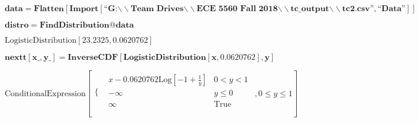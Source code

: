 
\usepackage{amsmath, amssymb, graphics, setspace}

\begin{doublespace}
\noindent\(\pmb{\text{data} = \text{Flatten}[\text{Import}[\text{{``}G:$\backslash \backslash $Team Drives$\backslash \backslash $ECE 5560 Fall 2018$\backslash
\backslash $tc$\_$output$\backslash \backslash $tc2.csv{''}},\text{{``}Data{''}}]]}\)
\end{doublespace}

\begin{doublespace}
\noindent\(\pmb{\text{distro} = \text{FindDistribution}@\text{data}}\)
\end{doublespace}

\begin{doublespace}
\noindent\(\text{LogisticDistribution}[23.2325,0.0620762]\)
\end{doublespace}

\begin{doublespace}
\noindent\(\pmb{\text{nextt}[\text{x$\_$},\text{y$\_$}]=\text{InverseCDF}[\text{LogisticDistribution}[x,0.0620762],y]}\)
\end{doublespace}

\begin{doublespace}
\noindent\(\text{ConditionalExpression}\left[
\begin{array}{ll}
 \{ & 
\begin{array}{ll}
 x-0.0620762 \text{Log}\left[-1+\frac{1}{y}\right] & 0<y<1 \\
 -\infty  & y\leq 0 \\
 \infty  & \text{True} \\
\end{array}
 \\
\end{array}
,0\leq y\leq 1\right]\)
\end{doublespace}

